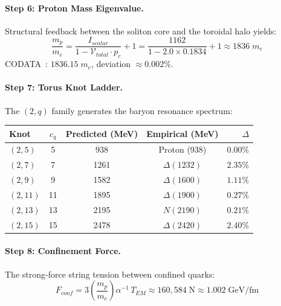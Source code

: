 \paragraph{Step 6: Proton Mass Eigenvalue.}
Structural feedback between the soliton core and the toroidal halo yields:
\begin{equation}
    \frac{m_p}{m_e}
    = \frac{I_{scalar}}{1 - \mathcal{V}_{total} \cdot p_c} + 1
    = \frac{1162}{1 - 2.0 \times 0.1834} + 1
    \approx \boxed{1836\;m_e}
    \label{eq:proton}
\end{equation}
CODATA~\cite{codata2018}: $1836.15\;m_e$, deviation $\approx 0.002\%$.

\paragraph{Step 7: Torus Knot Ladder.}
The $(2,q)$ family generates the baryon resonance spectrum:

\begin{center}
\begin{tabular}{lcccr}
    \toprule
    \textbf{Knot} & \textbf{$c_q$} & \textbf{Predicted (MeV)}
    & \textbf{Empirical (MeV)} & \textbf{$\Delta$} \\
    \midrule
    $(2,5)$  & 5  & 938  & Proton (938)   & $0.00\%$ \\
    $(2,7)$  & 7  & 1261 & $\Delta(1232)$ & $2.35\%$ \\
    $(2,9)$  & 9  & 1582 & $\Delta(1600)$ & $1.11\%$ \\
    $(2,11)$ & 11 & 1895 & $\Delta(1900)$ & $0.27\%$ \\
    $(2,13)$ & 13 & 2195 & $N(2190)$      & $0.21\%$ \\
    $(2,15)$ & 15 & 2478 & $\Delta(2420)$ & $2.40\%$ \\
    \bottomrule
\end{tabular}
\end{center}

\paragraph{Step 8: Confinement Force.}
The strong-force string tension between confined quarks:
\begin{equation}
    F_{conf}
    = 3\!\left(\frac{m_p}{m_e}\right)\alpha^{-1}\,T_{EM}
    \approx 160{,}584\;\text{N}
    \approx 1.002\;\text{GeV/fm}
    \label{eq:confinement}
\end{equation}

